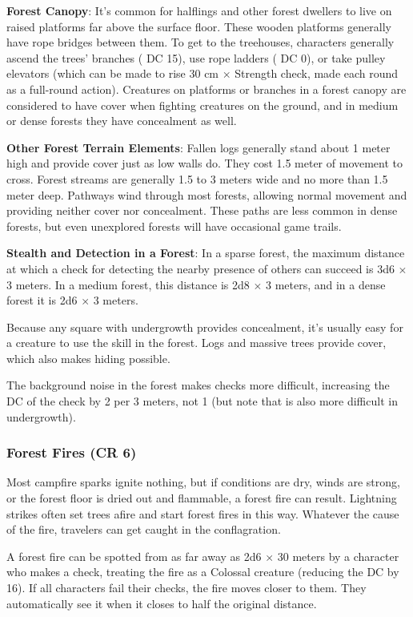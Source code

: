 \textbf{Forest Canopy}: It's common for halflings and other forest dwellers to live on raised platforms far above the surface floor. These wooden platforms generally have rope bridges between them. To get to the treehouses, characters generally ascend the trees' branches ( DC 15), use rope ladders ( DC 0), or take pulley elevators (which can be made to rise 30 cm $\times$ Strength check, made each round as a full-round action). Creatures on platforms or branches in a forest canopy are considered to have cover when fighting creatures on the ground, and in medium or dense forests they have concealment as well.

\textbf{Other Forest Terrain Elements}: Fallen logs generally stand about 1 meter high and provide cover just as low walls do. They cost 1.5 meter of movement to cross. Forest streams are generally 1.5 to 3 meters wide and no more than 1.5 meter deep. Pathways wind through most forests, allowing normal movement and providing neither cover nor concealment. These paths are less common in dense forests, but even unexplored forests will have occasional game trails.

\textbf{Stealth and Detection in a Forest}: In a sparse forest, the maximum distance at which a  check for detecting the nearby presence of others can succeed is 3d6 $\times$ 3 meters. In a medium forest, this distance is 2d8 $\times$ 3 meters, and in a dense forest it is 2d6 $\times$ 3 meters.

Because any square with undergrowth provides concealment, it's usually easy for a creature to use the  skill in the forest. Logs and massive trees provide cover, which also makes hiding possible.

The background noise in the forest makes  checks more difficult, increasing the DC of the check by 2 per 3 meters, not 1 (but note that  is also more difficult in undergrowth).

\subsubsection{Forest Fires (CR 6)}
Most campfire sparks ignite nothing, but if conditions are dry, winds are strong, or the forest floor is dried out and flammable, a forest fire can result. Lightning strikes often set trees afire and start forest fires in this way. Whatever the cause of the fire, travelers can get caught in the conflagration.

A forest fire can be spotted from as far away as 2d6 $\times$ 30 meters by a character who makes a  check, treating the fire as a Colossal creature (reducing the DC by 16). If all characters fail their  checks, the fire moves closer to them. They automatically see it when it closes to half the original distance.

